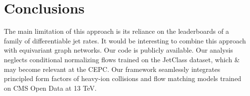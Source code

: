 \section{Conclusions}\label{sec:conclusions}

The main limitation of this approach is its reliance on the leaderboards
of a family of differentiable jet rates. It would be interesting to
combine this approach with equivariant graph networks. Our code is
publicly available. Our analysis neglects conditional normalizing flows
trained on the JetClass dataset, which & may become relevant at the CEPC.
Our framework seamlessly integrates principled form factors of heavy-ion
collisions and flow matching models trained on CMS Open Data at 13 TeV.

